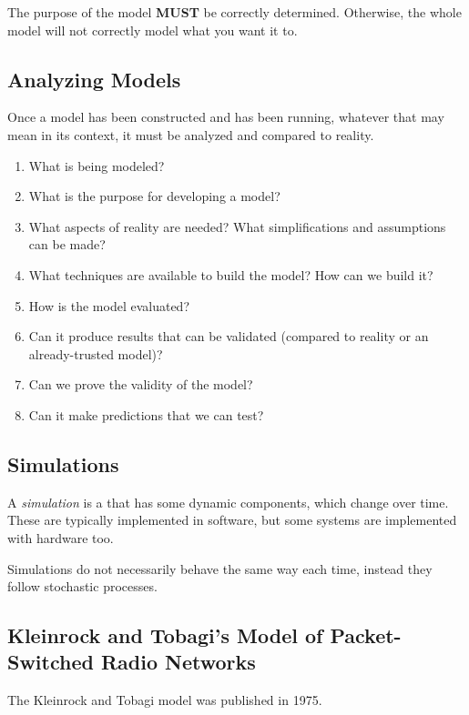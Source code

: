 The purpose of the model \textbf{MUST} be correctly determined.
Otherwise, the whole model will not correctly model what you want it to.

\subsection{Analyzing Models}\label{subsec:Model_Analysis}
Once a model has been constructed and has been running, whatever that may mean in its context, it must be analyzed and compared to reality.
\begin{enumerate}[noitemsep]
\item What is being modeled?
\item What is the purpose for developing a model?
\item What aspects of reality are needed? What simplifications and assumptions can be made?
\item What techniques are available to build the model? How can we build it?
\item How is the model evaluated?
\item Can it produce results that can be validated (compared to reality or an already-trusted model)?
\item Can we prove the validity of the model?
\item Can it make predictions that we can test?
\end{enumerate}

\subsection{Simulations}\label{subsec:Simulations}
\begin{definition}[Simulation]\label{def:Simulation}
  A \emph{simulation} is a  that has some dynamic components, which change over time.
  These are typically implemented in software, but some systems are implemented with hardware too.

  \begin{remark}\label{rmk:Stochastic_Simulations}
    Simulations do not necessarily behave the same way each time, instead they follow stochastic processes.
  \end{remark}
\end{definition}

\subsection{Kleinrock and Tobagi's Model of Packet-Switched Radio Networks}\label{subsec:Kleinrock_Tobagi_Model}
The Kleinrock and Tobagi model was published in 1975.

